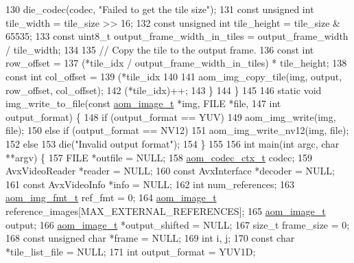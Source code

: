 \begin{DoxyCodeInclude}
{130       die\_codec(codec, \textcolor{stringliteral}{"Failed to get the tile size"});
131     \textcolor{keyword}{const} \textcolor{keywordtype}{unsigned} \textcolor{keywordtype}{int} tile\_width = tile\_size >> 16;
132     \textcolor{keyword}{const} \textcolor{keywordtype}{unsigned} \textcolor{keywordtype}{int} tile\_height = tile\_size & 65535;
133     \textcolor{keyword}{const} uint8\_t output\_frame\_width\_in\_tiles = output\_frame\_width / tile\_width;
134 
135     \textcolor{comment}{// Copy the tile to the output frame.}
136     \textcolor{keyword}{const} \textcolor{keywordtype}{int} row\_offset =
137         (*tile\_idx / output\_frame\_width\_in\_tiles) * tile\_height;
138     \textcolor{keyword}{const} \textcolor{keywordtype}{int} col\_offset =
139         (*tile\_idx %
140 
141     aom\_img\_copy\_tile(img, output, row\_offset, col\_offset);
142     (*tile\_idx)++;
143   \}
144 \}
145 
146 \textcolor{keyword}{static} \textcolor{keywordtype}{void} img\_write\_to\_file(\textcolor{keyword}{const} \hyperlink{structaom__image}{aom\_image\_t} *img, FILE *file,
147                               \textcolor{keywordtype}{int} output\_format) \{
148   \textcolor{keywordflow}{if} (output\_format == YUV)
149     aom\_img\_write(img, file);
150   \textcolor{keywordflow}{else} \textcolor{keywordflow}{if} (output\_format == NV12)
151     aom\_img\_write\_nv12(img, file);
152   \textcolor{keywordflow}{else}
153     die(\textcolor{stringliteral}{"Invalid output format"});
154 \}
155 
156 \textcolor{keywordtype}{int} main(\textcolor{keywordtype}{int} argc, \textcolor{keywordtype}{char} **argv) \{
157   FILE *outfile = NULL;
158   \hyperlink{structaom__codec__ctx}{aom\_codec\_ctx\_t} codec;
159   AvxVideoReader *reader = NULL;
160   \textcolor{keyword}{const} AvxInterface *decoder = NULL;
161   \textcolor{keyword}{const} AvxVideoInfo *info = NULL;
162   \textcolor{keywordtype}{int} num\_references;
163   \hyperlink{aom__image_8h_ab71efff8c7f49380fad23b93bc2e9bfc}{aom\_img\_fmt\_t} ref\_fmt = 0;
164   \hyperlink{structaom__image}{aom\_image\_t} reference\_images[MAX\_EXTERNAL\_REFERENCES];
165   \hyperlink{structaom__image}{aom\_image\_t} output;
166   \hyperlink{structaom__image}{aom\_image\_t} *output\_shifted = NULL;
167   \textcolor{keywordtype}{size\_t} frame\_size = 0;
168   \textcolor{keyword}{const} \textcolor{keywordtype}{unsigned} \textcolor{keywordtype}{char} *frame = NULL;
169   \textcolor{keywordtype}{int} i, j;
170   \textcolor{keyword}{const} \textcolor{keywordtype}{char} *tile\_list\_file = NULL;
171   \textcolor{keywordtype}{int} output\_format = YUV1D;
}
\end{DoxyCodeInclude}
